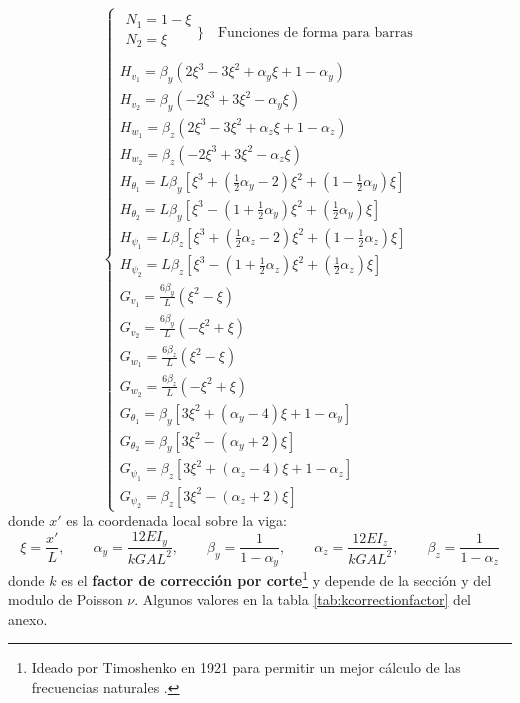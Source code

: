 \[
\begin{cases}
\!\!\!\!\!
\begin{array}{l}
N_{1}=1-\xi \\
N_2 = \xi \\
\end{array}\Bigg\}\quad  \text{Funciones de forma para barras}\\
H_{v_{1}}=\beta_{y}\left(2 \xi^{3}-3 \xi^{2}+\alpha_{y} \xi+1-\alpha_{y}\right)\\
H_{v_{2}}=\beta_{y}\left(-2 \xi^{3}+3 \xi^{2}-\alpha_{y} \xi\right) \\
H_{w_{1}}=\beta_{z}\left(2 \xi^{3}-3 \xi^{2}+\alpha_{z} \xi+1-\alpha_{z}\right) \\
H_{w_{2}}=\beta_{z}\left(-2 \xi^{3}+3 \xi^{2}-\alpha_{z} \xi\right)\\
H_{\theta_{1}}=L \beta_{y}\left[\xi^{3}+\left(\frac{1}{2} \alpha_{y}-2\right) \xi^{2}+\left(1-\frac{1}{2} \alpha_{y}\right) \xi\right] \\
H_{\theta_{2}}=L \beta_{y}\left[\xi^{3}-\left(1+\frac{1}{2} \alpha_{y}\right) \xi^{2}+\left(\frac{1}{2} \alpha_{y}\right) \xi\right] \\
H_{\psi_{1}}=L \beta_{z}\left[\xi^{3}+\left(\frac{1}{2} \alpha_{z}-2\right) \xi^{2}+\left(1-\frac{1}{2} \alpha_{z}\right) \xi\right] \\
H_{\psi_{2}}=L \beta_{z}\left[\xi^{3}-\left(1+\frac{1}{2} \alpha_{z}\right) \xi^{2}+\left(\frac{1}{2} \alpha_{z}\right) \xi\right] \\
G_{v_{1}}=\frac{6 \beta_{y}}{L}\left(\xi^{2}-\xi\right) \\
G_{v_{2}}=\frac{6 \beta_{y}}{L}\left(-\xi^{2}+\xi\right) \\
G_{w_{1}}=\frac{6 \beta_{z}}{L}\left(\xi^{2}-\xi\right) \\
G_{w_{2}}=\frac{6 \beta_{z}}{L}\left(-\xi^{2}+\xi\right) \\
G_{\theta_{1}}=\beta_{y}\left[3 \xi^{2}+\left(\alpha_{y}-4\right) \xi+1-\alpha_{y}\right] \\
G_{\theta_{2}}=\beta_{y}\left[3 \xi^{2}-\left(\alpha_{y}+2\right) \xi\right] \\
G_{\psi_{1}}=\beta_{z}\left[3 \xi^{2}+\left(\alpha_{z}-4\right) \xi+1-\alpha_{z}\right] \\
G_{\psi_{2}}=\beta_{z}\left[3 \xi^{2}-\left(\alpha_{z}+2\right) \xi\right]
\end{cases}
\]
donde $x'$ es la coordenada local sobre la viga:
\[
\xi=\frac{x'}{L}, \qquad \alpha_{y}=\frac{12 E I_{y}}{k G A L^{2}}, \qquad \beta_{y}=\frac{1}{1-\alpha_{y}}, \qquad \alpha_{z}=\frac{12 E I_{z}}{k G A L^{2}},\qquad \beta_{z}=\frac{1}{1-\alpha_{z}}
\]
donde $k$ es el \textbf{factor de corrección por corte}\footnote{Ideado por Timoshenko en 1921 para permitir un mejor cálculo de las frecuencias naturales \cite{dong2010much}.} y depende de la sección y del modulo de Poisson $\nu$. Algunos valores en la tabla \ref{tab:kcorrectionfactor} del anexo.

